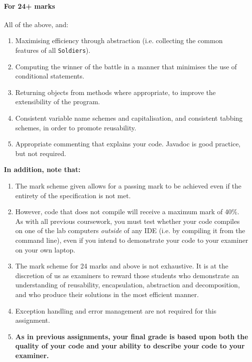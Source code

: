 \documentclass[11pt]{article}
\begin{document}
\paragraph{For 24+ marks}
			
			All of the above, and:  \begin{enumerate}
							      \item Maximising efficiency through abstraction (i.e. collecting the common features of all \texttt{Soldiers}).
							      \item Computing the winner of the battle in a manner that minimises the use of conditional statements.
							      \item Returning objects from methods where appropriate, to improve the extensibility of the program.
							      \item Consistent variable name schemes and capitalisation, and consistent tabbing schemes, in order to promote reusability.
							      \item Appropriate commenting that explains your code. Javadoc is good practice, but not required.
							      \end{enumerate} %
		
\textbf{In addition, note that:}

\begin{enumerate}
	
	\item The mark scheme given allows for a passing mark to be achieved even if the entirety of the specification is not met.
	
	\item However, code that does not compile will receive a maximum mark of 40\%. As with all previous coursework, you must test whether your code compiles on one of the lab computers \emph{outside} of any IDE (i.e. by compiling it from the command line), even if you intend to demonstrate your code to your examiner on your own laptop.
	
	\item The mark scheme for 24 marks and above is not exhaustive. It is at the discretion of us as examiners to reward those students who demonstrate an understanding of reusability, encapsulation, abstraction and decomposition, and who produce their solutions in the most efficient manner.

	\item Exception handling and error management are not required for this assignment.
	
	\item \textbf{As in previous assignments, your final grade is based upon both the quality of your code and your ability to describe your code to your examiner.}
		
\end{enumerate}
\end{document}
